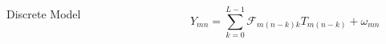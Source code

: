 \documentclass{beamer}
\begin{document}
\begin{frame}
\begin{columns}
\begin{column}{2in}
\begin{center}
\end{center}
\end{column}

\end{columns}

\vspace{-15pt}

\begin{columns}
\begin{column}{1.5in}
\begin{small}
\begin{center}
\vspace{10pt}
Discrete Model
\end{center}
\end{small}
\end{column}

\begin{column}{2.5in}
\vspace{20pt}
\scriptsize
\begin{equation*}
Y_{mn}=\sum_{k=0}^{L-1} \mathcal{F}_{m(n-k)k} T_{m(n-k)}+\omega_{mn}
\end{equation*}
\end{column}
\end{columns}

\end{frame}



%
%
%
%
%

\end{document}
